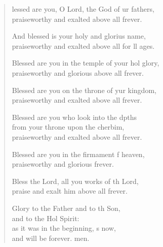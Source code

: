 \settowidth{\versewidth}{Blessed are you in the temple of your holy glory, *}
\begin{verse}%
  \begin{patverse}
lessed are you, O Lord, the God of ur fathers,\Med\\
praiseworthy and exalted above all frever.

And blessed is your holy and glorius name,\Med\\
praiseworthy and exalted above all for ll ages.

Blessed are you in the temple of your hol glory,\Med\\
praiseworthy and glorious above all frever.

Blessed are you on the throne of yur kingdom,\Med\\
praiseworthy and exalted above all frever.

Blessed are you who look into the dpths\Flex\\
from your throne upon the cherbim,\Med\\
praiseworthy and exalted above all frever.

Blessed are you in the firmament f heaven,\Med\\
praiseworthy and glorious frever.

Bless the Lord, all you works of th Lord,\Med\\
praise and exalt him above all frever.

Glory to the Father and to th Son,\Med\\
and to the Hol Spirit:\\
as it was in the beginning, \pointup{\i}s now,\Med\\
and will be forever. men. 
  \end{patverse}
\end{verse}
